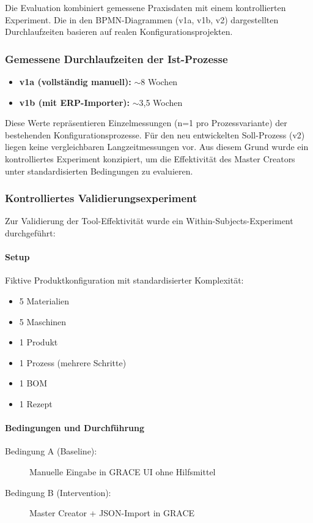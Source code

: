 Die Evaluation kombiniert gemessene Praxisdaten mit einem kontrollierten Experiment. Die in den BPMN-Diagrammen (v1a, v1b, v2) dargestellten Durchlaufzeiten basieren auf realen Konfigurationsprojekten.

\subsubsection{Gemessene Durchlaufzeiten der Ist-Prozesse}
\label{subsubsec:Praxisdaten}

\begin{itemize}
    \item \textbf{v1a (vollständig manuell):} $\sim$8 Wochen
    \item \textbf{v1b (mit ERP-Importer):} $\sim$3,5 Wochen
\end{itemize}

Diese Werte repräsentieren Einzelmessungen (n=1 pro Prozessvariante) der bestehenden Konfigurationsprozesse. Für den neu entwickelten Soll-Prozess (v2) liegen keine vergleichbaren Langzeitmessungen vor. Aus diesem Grund wurde ein kontrolliertes Experiment konzipiert, um die Effektivität des Master Creators unter standardisierten Bedingungen zu evaluieren.


\subsubsection{Kontrolliertes Validierungsexperiment}
\label{subsubsec:Experiment}

Zur Validierung der Tool-Effektivität wurde ein Within-Subjects-Experiment durchgeführt:

\paragraph{Setup}
Fiktive Produktkonfiguration mit standardisierter Komplexität:
\begin{itemize}
    \item 5 Materialien
    \item 5 Maschinen
    \item 1 Produkt
    \item 1 Prozess (mehrere Schritte)
    \item 1 BOM
    \item 1 Rezept
\end{itemize}

\paragraph{Bedingungen und Durchführung}
\begin{description}
    \item[Bedingung A (Baseline):] Manuelle Eingabe in GRACE UI ohne Hilfsmittel
    \item[Bedingung B (Intervention):] Master Creator + JSON-Import in GRACE
\end{description}

